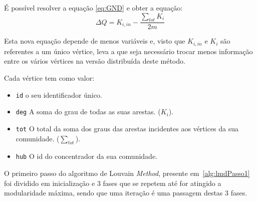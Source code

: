 É possível resolver a equação \ref{eq:GND} e obter a equação:
\begin{equation}
	\Delta Q  =  K_{i,in} - \frac{\sum_{tot} K_i}{2m}
\label{eq:GD}
\end{equation}


Esta nova equação depende de menos variáveis e, visto que $K_{i,in}$ e $K_i$ são referentes a um único vértice, leva a que seja necessário trocar menos informação entre os vários vértices na versão distribuída deste método.

Cada vértice tem como valor:
\begin{itemize}
	\item \verb|id| o seu identificador único.
	\item \verb|deg| A soma do grau de todas as suas arestas. ($K_i$).
	\item \verb|tot| O total da soma dos graus das arestas incidentes aos vértices da sua comunidade. ($\sum_{tot}$).
	\item \verb|hub| O id do concentrador da sua comunidade.
\end{itemize}

O primeiro passo do algoritmo de Louvain \textit{Method}, presente em~\ref{alg:lmdPasso1} foi dividido em inicialização e 3 fases que se repetem até for atingido a modularidade máxima, sendo que uma iteração é uma passagem destas 3 fases.

